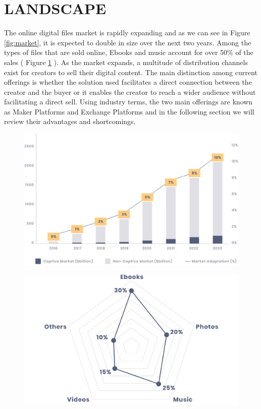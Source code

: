 
\section{LANDSCAPE} \label{landscape}

The online digital files market is rapidly expanding and as we can see in Figure \ref{fig:market}, it is expected to double in size over the next two years. Among the types of files that are sold online, Ebooks and music account for over 50\% of the sales ( Figure \ref{fig:file_categories} ). 
As the market expands, a multitude of distribution channels exist for creators to sell their digital content. The main distinction among current offerings is whether the solution used facilitates a direct connection between the creator and the buyer or it enables the creator to reach a wider audience without facilitating a direct sell. Using industry terms, the two main offerings are known as Maker Platforms and Exchange Platforms and in the following section we will review their advantages and shortcomings. 

\begin{figure}[b]
\centering
\begin{minipage}{.5\textwidth}
  \centering
  \includegraphics[width=0.8\linewidth]{./figures/fig1.jpg}
  \label{fig:market}
\end{minipage}%
\begin{minipage}{.5\textwidth}
  \centering
  \includegraphics[width=0.8\linewidth]{./figures/fig2.jpg}
  \label{fig:file_categories}
\end{minipage} 
\end{figure}


